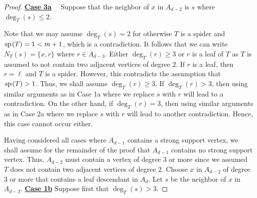 \documentclass[11pt]{article}
\newcommand{\spider}{\hskip1pt \textrm{sp} \hskip1pt}
\begin{document}
\begin{proof}
\noindent\underline{\textbf{Case 3a}} \ \ Suppose that the neighbor of $x$ in $A_{d-2}$ is $s$ where $\deg_T(s) \le 2$. 

\medskip
Note that we may assume $\deg_T(s) = 2$ for otherwise $T$ is a spider and $\spider(T) = 1 < m+1$, which is a contradiction. It follows that we can write $N_T(s) = \{x, r\}$ where $r \in A_{d-3}$. Either $\deg_T(r) \ge 3$ or $r$ is a leaf of $T$ as $T$ is assumed to not contain two adjacent vertices of degree $2$. If $r$ is a leaf, then $r = \ell$ and $T$ is a spider. However, this contradicts the assumption that $\spider(T) >1$. Thus, we shall assume $\deg_T(r) \ge3$. If $\deg_T(r)>3$, then using similar arguments as in Case 1a where we replace $s$ with $r$ will lead to a contradiction. On the other hand, if $\deg_T(r) = 3$, then using similar arguments as in Case 2a where we replace $s$ with $r$ will lead to another contradiction. Hence, this case cannot occur either. 
\medskip

Having considered all cases where $A_{d-1}$ contains a strong support vertex,  we shall assume for the remainder of the proof that $A_{d-1}$ contains no strong support vertex. Thus, $A_{d-2}$ must contain a vertex of degree $3$ or more since we assumed $T$ does not contain two adjacent vertices of degree $2$. Choose $x$ in $A_{d-2}$ of degree $3$ or more that contains a leaf descendant in $A_d$.  Let $s$ be the neighbor of $x$ in $A_{d-3}$. 
\vskip5mm
\noindent\underline{\textbf{Case 1b}} Suppose first that $\deg_T(s) >3$.


\end{proof}
\end{document}
